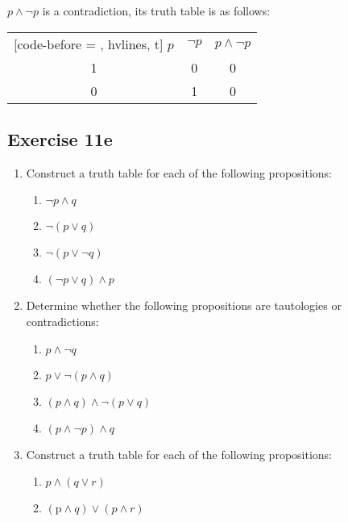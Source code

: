 \documentclass{report}
\begin{document}
$p \land \neg p$ is a contradiction, its truth table is as follows:
\begin{center}
    \begin{NiceTabular}{|c|c|c|}[code-before = , hvlines, t]
        $p$ & $\neg p$ & $p \land \neg p$ \\
        1   & 0        & 0                \\
        0   & 1        & 0                \\
    \end{NiceTabular}
\end{center}

\subsection*{Exercise 11e}
\begin{enumerate}[leftmargin=*]
    \item Construct a truth table for each of the following propositions:
          \begin{enumerate}[leftmargin=*]
              \item $\neg p \wedge q$
              \item $\neg(p \vee q)$
              \item $\neg(p \vee \neg q)$
              \item $(\neg p \vee q) \wedge p$
          \end{enumerate}
    \item Determine whether the following propositions are tautologies or contradictions:
          \begin{enumerate}[leftmargin=*]
              \item $p \wedge \neg q$
              \item $p \vee \neg(p \wedge q)$
              \item $(p \wedge q) \wedge \neg(p \vee q)$
              \item $(p \wedge \neg p) \wedge q$
          \end{enumerate}
    \item Construct a truth table for each of the following propositions:
          \begin{enumerate}[leftmargin=*]
              \item $p \wedge(q \vee r)$
              \item $(\mathrm{p} \wedge q) \vee(p \wedge r)$
          \end{enumerate}
\end{enumerate}
\end{document}
